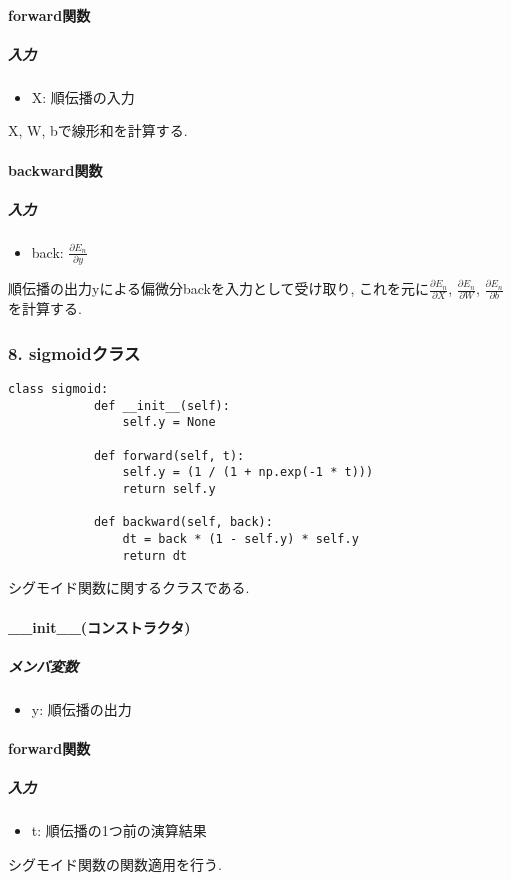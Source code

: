 \documentclass[a4j, titlepage]{jarticle}
\begin{document}
        \paragraph*{forward関数}
            \subparagraph*{入力}
            \begin{itemize}
                \item X: 順伝播の入力
            \end{itemize}
            X, W, bで線形和を計算する.
        \paragraph*{backward関数}
            \subparagraph*{入力}
            \begin{itemize}
                \item back: \(\displaystyle \frac{\partial E_n}{\partial y}\)
            \end{itemize}
            順伝播の出力yによる偏微分backを入力として受け取り, これを元に\(\displaystyle \frac{\partial E_n}{\partial X}\), \(\displaystyle \frac{\partial E_n}{\partial W}\), \(\displaystyle \frac{\partial E_n}{\partial b}\)を計算する.

    \subsubsection*{8. sigmoidクラス}
        \begin{lstlisting}[caption=シグモイド関数の計算 ,label=fuga]
        class sigmoid:
            def __init__(self):
                self.y = None

            def forward(self, t):
                self.y = (1 / (1 + np.exp(-1 * t)))
                return self.y

            def backward(self, back):
                dt = back * (1 - self.y) * self.y
                return dt
        \end{lstlisting}
        シグモイド関数に関するクラスである.
        \paragraph*{\_\_init\_\_(コンストラクタ)}
            \subparagraph*{メンバ変数}
            \begin{itemize}
                \item y: 順伝播の出力
            \end{itemize}
        \paragraph*{forward関数}
            \subparagraph*{入力}
            \begin{itemize}
                \item t: 順伝播の1つ前の演算結果
            \end{itemize}
            シグモイド関数の関数適用を行う.
\end{document}
